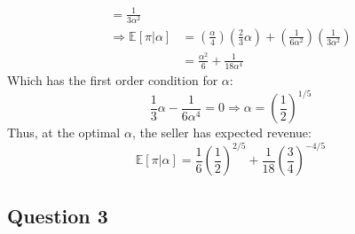 \documentclass{article}
\newcommand{\E}[1]{\mathbb{E}\left[#1\right]} %
\begin{document}
\begin{itemize}
\begin{align*}
															= \frac{1}{3\alpha^2}											\\
								\Rightarrow\E{\pi|\alpha}	&= \left(\frac{\alpha}{4}\right)\left(\frac{2}{3}\alpha\right)
										+\left(\frac{1}{6\alpha^2}\right)\left(\frac{1}{3\alpha^2}\right)	\\
															&= \frac{\alpha^2}{6} + \frac{1}{18\alpha^4}
	\end{align*}
	Which has the first order condition for $\alpha$:
	\[
		\frac{1}{3}\alpha - \frac{1}{6\alpha^4} = 0	\Rightarrow \alpha = \left(\frac{1}{2}\right)^{1/5}
	\]
	Thus, at the optimal $\alpha$, the seller has expected revenue:
	\[
		\E{\pi|\alpha} = \frac{1}{6}\left(\frac{1}{2}\right)^{2/5} + \frac{1}{18}\left(\frac{3}{4}\right)^{-4/5}
	\]


\end{itemize}



\subsection*{Question 3}
\end{document}

